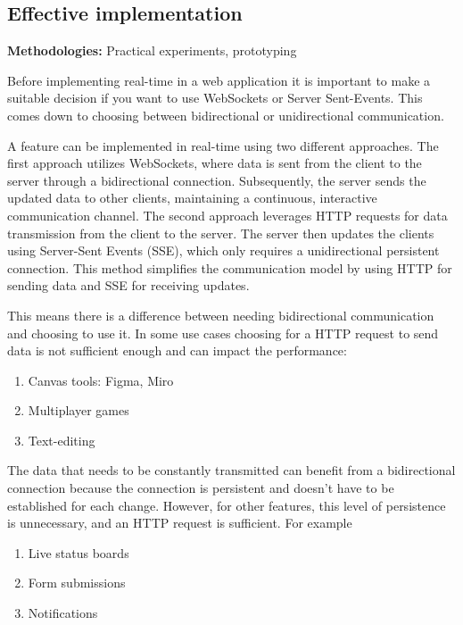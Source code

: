 \newpage

\subsection{Effective implementation}

\textbf{Methodologies:} Practical experiments, prototyping

Before implementing real-time in a web application it is important to make a suitable decision if you want to use WebSockets or Server Sent-Events. This comes down to choosing between bidirectional or unidirectional communication.

A feature can be implemented in real-time using two different approaches. The first approach utilizes WebSockets, where data is sent from the client to the server through a bidirectional connection. Subsequently, the server sends the updated data to other clients, maintaining a continuous, interactive communication channel. The second approach leverages HTTP requests for data transmission from the client to the server. The server then updates the clients using Server-Sent Events (SSE), which only requires a unidirectional persistent connection. This method simplifies the communication model by using HTTP for sending data and SSE for receiving updates.

This means there is a difference between needing bidirectional communication and choosing to use it. In some use cases choosing for a HTTP request to send data is not sufficient enough and can impact the performance:

\begin{enumerate}
  \item Canvas tools: Figma, Miro
  \item Multiplayer games
  \item Text-editing
\end{enumerate}

The data that needs to be constantly transmitted can benefit from a bidirectional connection because the connection is persistent and doesn't have to be established for each change. However, for other features, this level of persistence is unnecessary, and an HTTP request is sufficient. For example

\begin{enumerate}
  \item Live status boards
  \item Form submissions
  \item Notifications
\end{enumerate}

